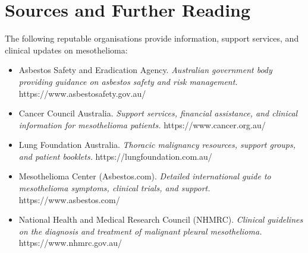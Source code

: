 \section*{Sources and Further Reading}
The following reputable organisations provide information, support services, and clinical updates on mesothelioma:
\begin{itemize}
    \item Asbestos Safety and Eradication Agency. \textit{Australian government body providing guidance on asbestos safety and risk management.} https://www.asbestosafety.gov.au/
    \item Cancer Council Australia. \textit{Support services, financial assistance, and clinical information for mesothelioma patients.} https://www.cancer.org.au/
    \item Lung Foundation Australia. \textit{Thoracic malignancy resources, support groups, and patient booklets.} https://lungfoundation.com.au/
    \item Mesothelioma Center (Asbestos.com). \textit{Detailed international guide to mesothelioma symptoms, clinical trials, and support.} https://www.asbestos.com/
    \item National Health and Medical Research Council (NHMRC). \textit{Clinical guidelines on the diagnosis and treatment of malignant pleural mesothelioma.} https://www.nhmrc.gov.au/
\end{itemize}
